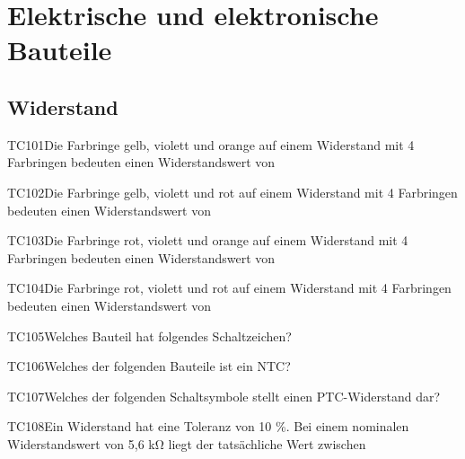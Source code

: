 \section{Elektrische und elektronische Bauteile}

\subsection{Widerstand}

\begin{question}{TC101}{Die Farbringe gelb, violett und orange auf einem Widerstand mit 4 Farbringen bedeuten einen Widerstandswert von}
\end{question}

\begin{question}{TC102}{Die Farbringe gelb, violett und rot auf einem Widerstand mit 4 Farbringen bedeuten einen Widerstandswert von}
\end{question}

\begin{question}{TC103}{Die Farbringe rot, violett und orange auf einem Widerstand mit 4 Farbringen bedeuten einen Widerstandswert von}
\end{question}

\begin{question}{TC104}{Die Farbringe rot, violett und rot auf einem Widerstand mit 4 Farbringen bedeuten einen Widerstandswert von}
\end{question}

\begin{question}{TC105}{Welches Bauteil hat folgendes Schaltzeichen?}
\end{question}

\begin{question}{TC106}{Welches der folgenden Bauteile ist ein NTC?}
\end{question}

\begin{question}{TC107}{Welches der folgenden Schaltsymbole stellt einen PTC-Widerstand dar?}
\end{question}

\begin{question}{TC108}{Ein Widerstand hat eine Toleranz von 10 \%. Bei einem nominalen Widerstandswert von 5,6 kΩ liegt der tatsächliche Wert zwischen}
\end{question}

